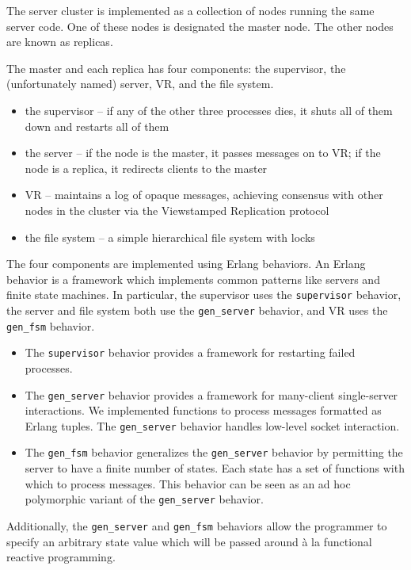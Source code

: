 \documentclass[10pt,letter]{article}
\begin{document}
The server cluster is implemented as a collection of nodes running the same
server code. One of these nodes is designated the master node. The other nodes
are known as replicas.

The master and each replica has four components: the supervisor, the
(unfortunately named) server, VR, and the file system.

\begin{itemize}
\item the supervisor -- if any of the other three processes dies, it shuts all
  of them down and restarts all of them
\item the server -- if the node is the master, it passes messages on to VR; if
  the node is a replica, it redirects clients to the master
\item VR -- maintains a log of opaque messages, achieving consensus with other
  nodes in the cluster via the Viewstamped Replication protocol
\item the file system -- a simple hierarchical file system with locks
\end{itemize}

The four components are implemented using Erlang behaviors. An Erlang behavior
is a framework which implements common patterns like servers and finite state
machines. In particular, the supervisor uses the \texttt{supervisor} behavior,
the server and file system both use the \texttt{gen\_server} behavior, and VR
uses the \texttt{gen\_fsm} behavior.

\begin{itemize}
\item The \texttt{supervisor} behavior provides a framework for restarting
  failed processes.
\item The \texttt{gen\_server} behavior provides a framework for many-client
  single-server interactions. We implemented functions to process messages
  formatted as Erlang tuples. The \texttt{gen\_server} behavior handles
  low-level socket interaction.
\item The \texttt{gen\_fsm} behavior generalizes the \texttt{gen\_server}
  behavior by permitting the server to have a finite number of states. Each
  state has a set of functions with which to process messages. This behavior can
  be seen as an ad hoc polymorphic variant of the \texttt{gen\_server} behavior.
\end{itemize}

Additionally, the \texttt{gen\_server} and \texttt{gen\_fsm} behaviors allow
the programmer to specify an arbitrary state value which will be passed around
\`{a} la functional reactive programming.
\end{document}
